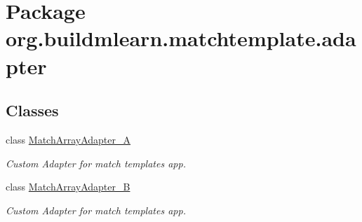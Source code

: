 \hypertarget{namespaceorg_1_1buildmlearn_1_1matchtemplate_1_1adapter}{}\section{Package org.\+buildmlearn.\+matchtemplate.\+adapter}
\label{namespaceorg_1_1buildmlearn_1_1matchtemplate_1_1adapter}
\subsection*{Classes}
\begin{DoxyCompactItemize}
\item 
class \hyperlink{classorg_1_1buildmlearn_1_1matchtemplate_1_1adapter_1_1MatchArrayAdapter__A}{Match\+Array\+Adapter\+\_\+A}
\begin{DoxyCompactList}\small\item\em Custom Adapter for match template\textquotesingle{}s app. \end{DoxyCompactList}\item 
class \hyperlink{classorg_1_1buildmlearn_1_1matchtemplate_1_1adapter_1_1MatchArrayAdapter__B}{Match\+Array\+Adapter\+\_\+B}
\begin{DoxyCompactList}\small\item\em Custom Adapter for match template\textquotesingle{}s app. \end{DoxyCompactList}\end{DoxyCompactItemize}
